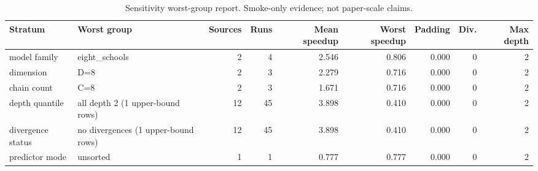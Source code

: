 \begin{table}[t]
\centering
\caption{Sensitivity worst-group report. Smoke-only evidence; not paper-scale claims.}
\label{tab:sensitivity-worst-groups}
\begin{tabular}{llrrrrrrr}
\hline
Stratum & Worst group & Sources & Runs & Mean speedup & Worst speedup & Padding & Div. & Max depth \\
\hline
model family & eight\_schools & 2 & 4 & 2.546 & 0.806 & 0.000 & 0 & 2 \\
dimension & D=8 & 2 & 3 & 2.279 & 0.716 & 0.000 & 0 & 2 \\
chain count & C=8 & 2 & 3 & 1.671 & 0.716 & 0.000 & 0 & 2 \\
depth quantile & all depth 2 (1 upper-bound rows) & 12 & 45 & 3.898 & 0.410 & 0.000 & 0 & 2 \\
divergence status & no divergences (1 upper-bound rows) & 12 & 45 & 3.898 & 0.410 & 0.000 & 0 & 2 \\
predictor mode & unsorted & 1 & 1 & 0.777 & 0.777 & 0.000 & 0 & 2 \\
\hline
\end{tabular}
\end{table}
